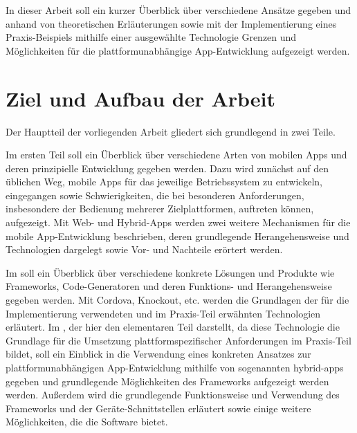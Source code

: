 In dieser Arbeit soll ein kurzer Überblick über verschiedene Ansätze gegeben und anhand von theoretischen Erläuterungen sowie mit der Implementierung eines Praxis-Beispiels mithilfe einer ausgewählte Technologie Grenzen und Möglichkeiten für die plattformunabhängige App-Entwicklung aufgezeigt werden.

	
\section{Ziel und Aufbau der Arbeit}

Der Hauptteil der vorliegenden Arbeit gliedert sich grundlegend in zwei Teile.

Im ersten Teil  soll ein Überblick über verschiedene Arten von mobilen Apps und deren prinzipielle Entwicklung gegeben werden. 
		Dazu wird zunächst auf den üblichen Weg, mobile Apps für das jeweilige Betriebssystem zu entwickeln, eingegangen sowie Schwierigkeiten, die bei besonderen Anforderungen, insbesondere der Bedienung mehrerer Zielplattformen, auftreten können, aufgezeigt.
		Mit Web- und Hybrid-Apps werden zwei weitere Mechanismen für die mobile App-Entwicklung beschrieben, deren grundlegende Herangehensweise und Technologien dargelegt sowie Vor- und Nachteile erörtert werden.

	Im  soll ein Überblick über verschiedene konkrete Lösungen und Produkte wie Frameworks, Code-Generatoren und deren Funktions- und Herangehensweise gegeben werden.
	Mit Cordova, Knockout, etc. werden die Grundlagen der für die Implementierung verwendeten und im Praxis-Teil erwähnten Technologien erläutert. 
	Im , der hier den elementaren Teil darstellt, da diese Technologie die Grundlage für die Umsetzung plattformspezifischer Anforderungen im Praxis-Teil bildet, soll ein Einblick in die Verwendung eines konkreten Ansatzes zur plattformunabhängigen App-Entwicklung mithilfe von sogenannten \glspl{hybrid-app} gegeben und grundlegende Möglichkeiten des Frameworks aufgezeigt werden werden.
	Außerdem wird die grundlegende Funktionsweise und Verwendung des Frameworks und der Geräte-Schnittstellen erläutert sowie einige weitere Möglichkeiten, die die Software bietet.

